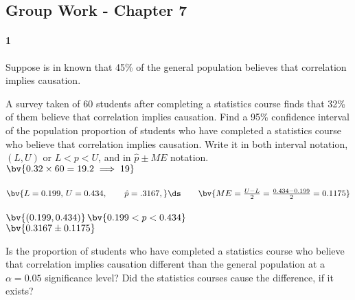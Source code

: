 \documentclass{article}
\begin{document}
\begin{flushleft}
\section*{Group Work - Chapter 7}
\paragraph{1} Suppose is in known that 45\% of the general population believes that correlation implies causation.
\begin{enumalpha}
\item A survey taken of 60 students after completing a statistics course finds that 32\% of them believe that correlation implies causation. Find a 95\% confidence interval of the population proportion of students who have completed a statistics course who believe that correlation implies causation. Write it in both interval notation, $(L, U)$ or $L < p < U$, and in $\hat p \pm ME$ notation.\\
\medskip
{}$\bv{0.32 \times 60 = 19.2 \implies 19}$\\
\medskip
{}\\
\medskip
$\bv{L = 0.199,\, U=0.434, \qquad \hat p= .3167,}\ds\qquad \bv{ME = \frac{U - L}{2} = \frac{0.434 - 0.199}{2} = 0.1175}$\\
\bigskip
{}\\$\bv{(0.199, 0.434)}$$\bv{0.199 < p < 0.434}$\\$\bv{0.3167 \pm 0.1175}$\\
\vspace{0.5in}

\item Is the proportion of students who have completed a statistics course who believe that correlation implies causation different than the general population at a $\alpha = 0.05$ significance level? Did the statistics courses cause the difference, if it exists?\\
\medskip
{}\\
\medskip
{}


\end{enumalpha}
\end{flushleft}
\end{document}

